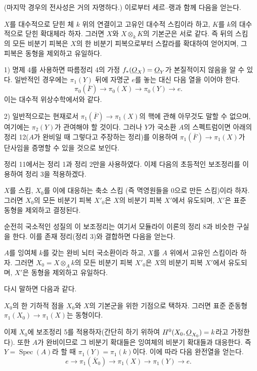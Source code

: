 (마지막 경우의 전사성은 거의 자명하다.) 이로부터 세르--랭과 함께 다음을
얻는다.

 $X$를 대수적으로 닫힌 체 $k$ 위의 연결이고 고유인
대수적 스킴이라 하고, $K$를 $k$의 대수적으로 닫힌 확대체라 하자. 그러면
$X$와 $X\otimes_kK$의 기본군은 서로 같다. 즉 뒤의 스킴의 모든 비분기
피복은 $X$의 한 비분기 피복으로부터 스칼라를 확대하여 얻어지며, 그 피복은
동형을 제외하고 유일하다.


1) 명제 4를 사용하면 따름정리 4의 가정 $f_*(\underline{O}_X)=\underline{O}_Y$가 본질적이지
않음을 알 수 있다. 일반적인 경우에는 $\pi_1(Y)$ 뒤에 자명군 $e$를 놓는
대신 다음 열을 이어야 한다.
\[
  \pi_0(\overline F)\longrightarrow\pi_0(X)
  \longrightarrow\pi_0(Y)\longrightarrow e.
\]
이는 대수적 위상수학에서와 같다.

2) 일반적으로는 현재로서
$\pi_1(\overline F)\longrightarrow\pi_1(X)$의 핵에 관해 아무것도 말할 수
없으며, 여기에는 $\pi_2(Y)$가 관여해야 할 것이다. 그러나 $Y$가 국소환
$A$의 스펙트럼이면 아래의 정리 12($A$가 완비일 때 그렇다고 주장하는
정리)를 이용하여 $\pi_1(\overline F)\longrightarrow\pi_1(X)$가 단사임을
증명할 수 있을 것으로 보인다.

정리 11에서는 정리 1과 정리 2만을 사용하였다. 이제 다음의 초등적인
보조정리를 이용하여 정리 3을 적용하겠다.

 $X$를 스킴, $X_0$를 이에 대응하는 축소 스킴
(즉 멱영원들을 0으로 만든 스킴)이라 하자. 그러면 $X_0$의 모든 비분기
피복 $X'_0$은 $X$의 비분기 피복 $X'$에서 유도되며, $X'$은 표준 동형을
제외하고 결정된다.

순전히 국소적인 성질의 이 보조정리는 여기서 모듈라이 이론의 정리 8과
비슷한 구실을 한다. 이를 존재 정리(정리 3)와 결합하면 다음을 얻는다.

 $A$를 잉여체 $k$를 갖는 완비 뇌터 국소환이라 하고,
$X$를 $A$ 위에서 고유인 스킴이라 하자. 그러면
$X_0=X\otimes_A k$의 모든 비분기 피복 $X'_0$은 $X$의 비분기 피복
$X'$에서 유도되며, $X'$은 동형을 제외하고 유일하다.

다시 말하면 다음과 같다.

 $X_0$의 한 기하적 점을 $X_0$와 $X$의 기본군을 위한
기점으로 택하자. 그러면 표준 준동형
$\pi_1(X_0)\longrightarrow\pi_1(X)$는 동형이다.

이제 $X_0$에 보조정리 5를 적용하자(간단히 하기 위하여
$H^0(X_0,\underline{O}_{X_0})=k$라고 가정한다). 또한 $A$가 완비이므로 그 비분기
확대들은 잉여체의 비분기 확대들과 대응한다. 즉
$Y=\operatorname{Spec}(A)$라 할 때 $\pi_1(Y)=\pi_1(k)$이다. 이에 따라
다음 완전열을 얻는다.
\[
  e\longrightarrow\pi_1(\overline X_0)
  \longrightarrow\pi_1(X)\longrightarrow\pi_1(Y)\longrightarrow e.
\]

